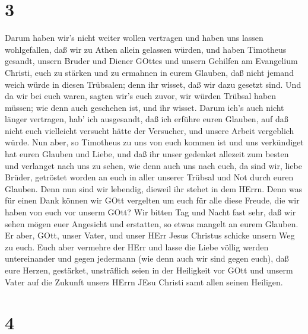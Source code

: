 \hypertarget{section-2}{%
\section{3}\label{section-2}}

 Darum haben wir's nicht weiter wollen vertragen und haben
uns lassen wohlgefallen, daß wir zu Athen allein gelassen würden,
 und haben Timotheus gesandt, unsern Bruder und Diener
GOttes und unsern Gehilfen am Evangelium Christi, euch zu stärken und zu
ermahnen in eurem Glauben,  daß nicht jemand weich würde in
diesen Trübsalen; denn ihr wisset, daß wir dazu gesetzt sind.
 Und da wir bei euch waren, sagten wir's euch zuvor, wir
würden Trübsal haben müssen; wie denn auch geschehen ist, und ihr
wisset.  Darum ich's auch nicht länger vertragen, hab' ich
ausgesandt, daß ich erführe euren Glauben, auf daß nicht euch vielleicht
versucht hätte der Versucher, und unsere Arbeit vergeblich würde.
 Nun aber, so Timotheus zu uns von euch kommen ist und uns
verkündiget hat euren Glauben und Liebe, und daß ihr unser gedenket
allezeit zum besten und verlanget nach uns zu sehen, wie denn auch uns
nach euch,  da sind wir, liebe Brüder, getröstet worden an
euch in aller unserer Trübsal und Not durch euren Glauben. 
Denn nun sind wir lebendig, dieweil ihr stehet in dem HErrn.
 Denn was für einen Dank können wir GOtt vergelten um euch
für alle diese Freude, die wir haben von euch vor unserm GOtt?
 Wir bitten Tag und Nacht fast sehr, daß wir sehen mögen
euer Angesicht und erstatten, so etwas mangelt an eurem Glauben.
 Er aber, GOtt, unser Vater, und unser HErr Jesus Christus
schicke unsern Weg zu euch.  Euch aber vermehre der HErr
und lasse die Liebe völlig werden untereinander und gegen jedermann (wie
denn auch wir sind gegen euch),  daß eure Herzen,
gestärket, unsträflich seien in der Heiligkeit vor GOtt und unserm Vater
auf die Zukunft unsers HErrn JEsu Christi samt allen seinen Heiligen.

\hypertarget{section-3}{%
\section{4}\label{section-3}}

